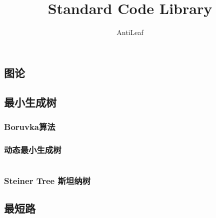 \documentclass[a4paper]{article}
\title{Standard Code Library}
\author{AntiLeaf}
\date{}
\begin{document}
	\begin{titlepage}
		
		

	\end{titlepage}

	\begin{multicols}{2}
		
		\begin{spacing}{1}
			\tableofcontents
		\end{spacing}
		\newpage

	\end{multicols}

	\begin{multicols}{2}

		\section{图论}

			\subsection{最小生成树}
				\subsubsection{Boruvka算法}
					
				
				\subsubsection{动态最小生成树}
					\inputminted{cpp}{../src/graph/动态最小生成树.cpp}
				

				
				\subsubsection{Steiner Tree 斯坦纳树}
					
			
			
			\subsection{最短路}
					

\end{multicols}
\end{document}
